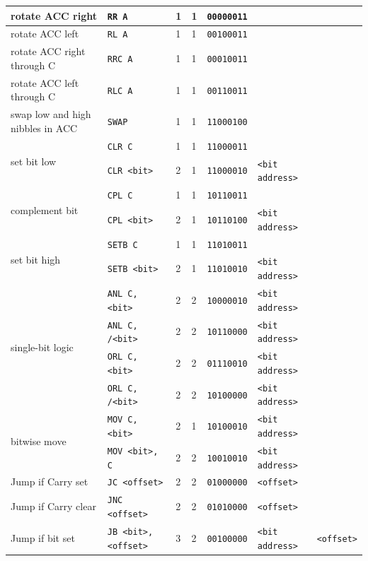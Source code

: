 \documentclass[journal]{IEEEtran}
\begin{document}
{{\begin{tabular}{|l|l|l|l|l|l|l|}
		\hline
		rotate ACC right & \texttt{RR A}
		& 1 & 1 & \texttt{00000011} & & \\
		\hline
		rotate ACC left & \texttt{RL A}
		& 1 & 1 & \texttt{00100011} & & \\
		\hline
		rotate ACC right through C
		& \texttt{RRC A} & 1 & 1 & \texttt{00010011} & & \\
		\hline
		rotate ACC left through C
		& \texttt{RLC A} & 1 & 1 & \texttt{00110011} & & \\
		\hline
		swap low and high nibbles in ACC
		& \texttt{SWAP} & 1 & 1 & \texttt{11000100} & & \\
		\hline
		\multirow{2}{*}{set bit low}
		& \texttt{CLR C} & 1 & 1 & \texttt{11000011} & & \\
		& \texttt{CLR <bit>} & 2 & 1 & \texttt{11000010} & \texttt{<bit address>} & \\
		\hline
		\multirow{2}{*}{complement bit}
		& \texttt{CPL C} & 1 & 1 & \texttt{10110011} & & \\
		& \texttt{CPL <bit>} & 2 & 1 & \texttt{10110100} & \texttt{<bit address>} & \\
		\hline
		\multirow{2}{*}{set bit high} &
		\texttt{SETB C} & 1 & 1 & \texttt{11010011} & & \\
		& \texttt{SETB <bit>} & 2 & 1 & \texttt{11010010} & \texttt{<bit address>} & \\
		\hline
		\multirow{4}{*}{single-bit logic}
		& \texttt{ANL C, <bit>} & 2 & 2 & \texttt{10000010} & \texttt{<bit address>} & \\
		& \texttt{ANL C, /<bit>} & 2 & 2 & \texttt{10110000} & \texttt{<bit address>} & \\
		& \texttt{ORL C, <bit>} & 2 & 2 & \texttt{01110010} & \texttt{<bit address>} & \\
		& \texttt{ORL C, /<bit>} & 2 & 2 & \texttt{10100000} & \texttt{<bit address>} & \\
		\hline
		\multirow{2}{*}{bitwise move}
		& \texttt{MOV C, <bit>} & 2 & 1 & \texttt{10100010} & \texttt{<bit address>} & \\
		& \texttt{MOV <bit>, C} & 2 & 2 & \texttt{10010010} & \texttt{<bit address>} & \\
		\hline
		Jump if Carry set
		& \texttt{JC <offset>} & 2 & 2 & \texttt{01000000} & \texttt{<offset>} & \\
		\hline
		Jump if Carry clear
		& \texttt{JNC <offset>} & 2 & 2 & \texttt{01010000} & \texttt{<offset>} & \\
		\hline
		Jump if bit set
		& \texttt{JB <bit>, <offset>} & 3 & 2 & \texttt{00100000} & \texttt{<bit address>} & \texttt{<offset>} \\

\end{tabular}}}
\end{document}
